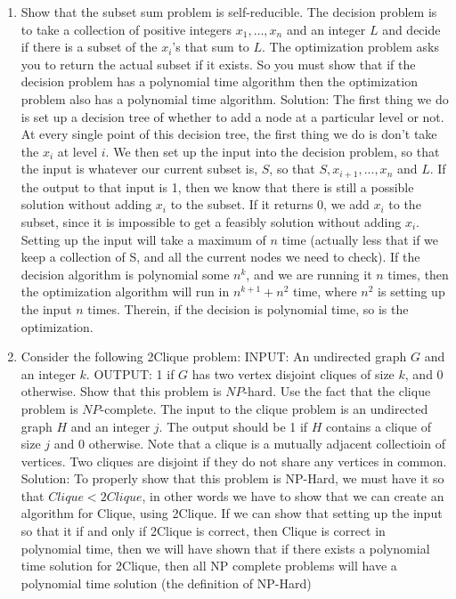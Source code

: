 \documentclass{article}
\begin{document}
\begin{enumerate}
\newline
\setcounter{enumi}{7}
\item Show that the subset sum problem is self-reducible. The decision problem is to take a collection of positive integers $x_1,\ldots ,x_n$ and an integer $L$ and decide if there is a subset of the $x_i$'s that sum to $L$. The optimization problem asks you to return the actual subset if it exists. So you must show that if the decision problem has a polynomial time algorithm then the optimization problem also has a polynomial time algorithm.
\newline
\newline Solution: The first thing we do is set up a decision tree of whether to add a node at a particular level or not. At every single point of this decision tree, the first thing we do is don't take the $x_i$ at level $i$. We then set up the input into the decision problem, so that the input is whatever our current subset is, $S$, so that $S,x_{i+1},...,x_n$ and $L$. If the output to that input is 1, then we know that there is still a possible solution without adding $x_i$ to the subset. If it returns 0, we add $x_i$ to the subset, since it is impossible to get a feasibly solution without adding $x_i$. Setting up the input will take a maximum of $n$ time (actually less that if we keep a collection of S, and all the current nodes we need to check). If the decision algorithm is polynomial some $n^k$, and we are running it $n$ times, then the optimization algorithm will run in $n^{k+1} + n^2$ time, where $n^2$ is setting up the input $n$ times. Therein, if the decision is polynomial time, so is the optimization.
\newline
\setcounter{enumi}{11}
\item Consider the following 2Clique problem:
\newline INPUT: An undirected graph $G$ and an integer $k$.
\newline OUTPUT: 1 if $G$ has two vertex disjoint cliques of size $k$, and 0 otherwise.
\newline Show that this problem is $NP$-hard. Use the fact that the clique problem is $NP$-complete. The input to the clique problem is an undirected graph $H$ and an integer $j$. The output should be 1 if $H$ contains a clique of size $j$ and 0 otherwise. Note that a clique is a mutually adjacent collectioin of vertices. Two cliques are disjoint if they do not share any vertices in common.
\newline
\newline Solution: To properly show that this problem is NP-Hard, we must have it so that $Clique < 2Clique$, in other words we have to show that we can create an algorithm for Clique, using 2Clique. If we can show that setting up the input so that it if and only if 2Clique is correct, then Clique is correct in polynomial time, then we will have shown that if there exists a polynomial time solution for 2Clique, then all NP complete problems will have a polynomial time solution (the definition of NP-Hard)

\end{enumerate}
\end{document}
